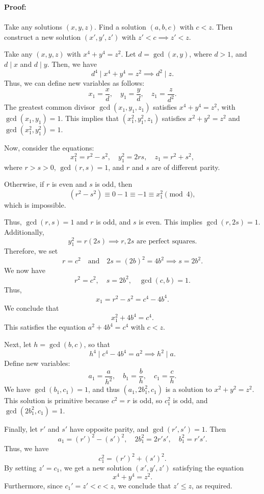 \documentclass{article}
\begin{document}
\textbf{Proof:}\\\\
Take any solutions \( (x, y, z) \). Find a solution \( (a, b, c) \) with \( c < z \). Then construct a new solution \( (x', y', z') \) with \( z' < c \implies z' < z \).

Take any \( (x, y, z) \) with \( x^4 + y^4 = z^2 \). Let \( d = \gcd(x, y) \), where \( d > 1 \), and \( d \mid x \) and \( d \mid y \). Then, we have
\[
d^4 \mid x^4 + y^4 = z^2 \implies d^2 \mid z.
\]
Thus, we can define new variables as follows:
\[
x_1 = \frac{x}{d}, \quad y_1 = \frac{y}{d}, \quad z_1 = \frac{z}{d^2}.
\]
The greatest common divisor \( \gcd(x_1, y_1, z_1) \) satisfies \( x^4 + y^4 = z^2 \), with \( \gcd(x_1, y_1) = 1 \). This implies that \( (x_1^2, y_1^2, z_1) \) satisfies \( x^2 + y^2 = z^2 \) and \( \gcd(x_1^2, y_1^2) = 1 \).

Now, consider the equations:
\[
x_1^2 = r^2 - s^2, \quad y_1^2 = 2rs, \quad z_1 = r^2 + s^2,
\]
where \( r > s > 0 \), \( \gcd(r, s) = 1 \), and \( r \) and \( s \) are of different parity.


Otherwise, if \( r \) is even and \( s \) is odd, then
\[
(r^2 - s^2) \equiv 0 - 1 \equiv -1 \equiv x_1^2 \pmod{4},
\]
which is impossible.

Thus, \( \gcd(r, s) = 1 \) and \( r \) is odd, and \( s \) is even. This implies \( \gcd(r, 2s) = 1 \). Additionally,
\[
y_1^2 = r(2s) \implies r, 2s \text{ are perfect squares.}
\]
Therefore, we set
\[
r = c^2 \quad \text{and} \quad 2s = (2b)^2 = 4b^2 \implies s = 2b^2.
\]
We now have
\[
r^2 = c^2, \quad s = 2b^2, \quad \gcd(c, b) = 1.
\]
Thus,
\[
x_1 = r^2 - s^2 = c^4 - 4b^4.
\]
We conclude that
\[
x_1^2 + 4b^4 = c^4.
\]
This satisfies the equation \( a^2 + 4b^4 = c^4 \) with \( c < z \).

Next, let \( h = \gcd(b, c) \), so that
\[
h^4 \mid c^4 - 4b^4 = a^2 \implies h^2 \mid a.
\]
Define new variables:
\[
a_1 = \frac{a}{h^2}, \quad b_1 = \frac{b}{h}, \quad c_1 = \frac{c}{h}.
\]
We have \( \gcd(b_1, c_1) = 1 \), and thus \( (a_1, 2b_1^2, c_1) \) is a solution to \( x^2 + y^2 = z^2 \). This solution is primitive because \( c^2 = r \) is odd, so \( c_1^2 \) is odd, and \( \gcd(2b_1^2, c_1) = 1 \).

Finally, let \( r' \) and \( s' \) have opposite parity, and \( \gcd(r', s') = 1 \). Then
\[
a_1 = (r')^2 - (s')^2, \quad 2b_1^2 = 2r's', \quad b_1^2 = r's'.
\]
Thus, we have
\[
c_1^2 = (r')^2 + (s')^2.
\]
By setting \( z' = c_1 \), we get a new solution \( (x', y', z') \) satisfying the equation
\[
x^4 + y^4 = z^2.
\]
Furthermore, since \( c_1' = z' < c < z \), we conclude that \( z' \leq z \), as required.
\end{document}
